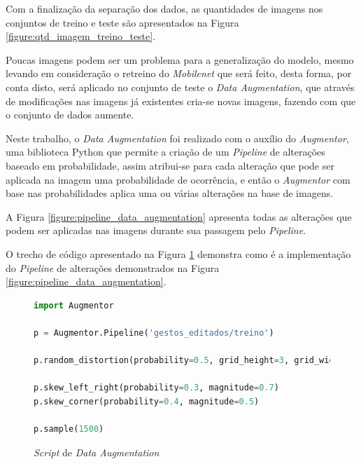 \par Com a finalização da separação dos dados, as quantidades de imagens nos conjuntos de treino e teste são apresentados na Figura \ref{figure:qtd_imagem_treino_teste}.


\par Poucas imagens podem ser um problema para a generalização do modelo, mesmo levando em consideração o retreino do \textit{Mobilenet} que será feito, desta forma, por conta disto, será aplicado no conjunto de teste o \textit{Data Augmentation}, que através de modificações nas imagens já existentes cria-se novas imagens, fazendo com que o conjunto de dados aumente.

\par Neste trabalho, o \textit{Data Augmentation} foi realizado com o auxílio do \textit{Augmentor}, uma biblioteca Python que permite a criação de um \textit{Pipeline} de alterações baseado em probabilidade, assim atribui-se para cada alteração que pode ser aplicada na imagem uma probabilidade de ocorrência, e então o \textit{Augmentor} com base nas probabilidades aplica uma ou várias alterações na base de imagens. 

\par A Figura \ref{figure:pipeline_data_augmentation} apresenta todas as alterações que podem ser aplicadas nas imagens durante sua passagem pelo \textit{Pipeline}.


\par O trecho de código apresentado na Figura \ref{figure:dataaugmentation} demonstra como é a implementação do \textit{Pipeline} de alterações demonstrados na Figura \ref{figure:pipeline_data_augmentation}.

\begin{figure}[H]
    \centering
    \begin{lstlisting}[language=Python]
import Augmentor

p = Augmentor.Pipeline('gestos_editados/treino')

p.random_distortion(probability=0.5, grid_height=3, grid_width=3, magnitude=2)

p.skew_left_right(probability=0.3, magnitude=0.7)
p.skew_corner(probability=0.4, magnitude=0.5)

p.sample(1500)
    \end{lstlisting}
    \caption{\textit{Script} de \textit{Data Augmentation}}
    \label{figure:dataaugmentation}
\end{figure}

